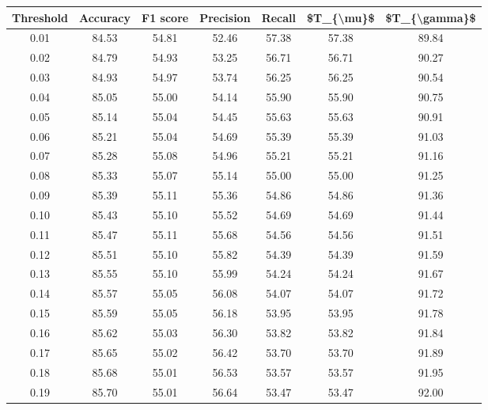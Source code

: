 \begin{tabular}{|c|c|c|c|c|c|c|}
\hline
 Threshold &  Accuracy &  F1 score &  Precision &  Recall &  \$T\_\{\textbackslash mu\}\$ &  \$T\_\{\textbackslash gamma\}\$ \\
\hline
      0.01 &     84.53 &     54.81 &      52.46 &   57.38 &      57.38 &         89.84 \\
      0.02 &     84.79 &     54.93 &      53.25 &   56.71 &      56.71 &         90.27 \\
      0.03 &     84.93 &     54.97 &      53.74 &   56.25 &      56.25 &         90.54 \\
      0.04 &     85.05 &     55.00 &      54.14 &   55.90 &      55.90 &         90.75 \\
      0.05 &     85.14 &     55.04 &      54.45 &   55.63 &      55.63 &         90.91 \\
      0.06 &     85.21 &     55.04 &      54.69 &   55.39 &      55.39 &         91.03 \\
      0.07 &     85.28 &     55.08 &      54.96 &   55.21 &      55.21 &         91.16 \\
      0.08 &     85.33 &     55.07 &      55.14 &   55.00 &      55.00 &         91.25 \\
      0.09 &     85.39 &     55.11 &      55.36 &   54.86 &      54.86 &         91.36 \\
      0.10 &     85.43 &     55.10 &      55.52 &   54.69 &      54.69 &         91.44 \\
      0.11 &     85.47 &     55.11 &      55.68 &   54.56 &      54.56 &         91.51 \\
      0.12 &     85.51 &     55.10 &      55.82 &   54.39 &      54.39 &         91.59 \\
      0.13 &     85.55 &     55.10 &      55.99 &   54.24 &      54.24 &         91.67 \\
      0.14 &     85.57 &     55.05 &      56.08 &   54.07 &      54.07 &         91.72 \\
      0.15 &     85.59 &     55.05 &      56.18 &   53.95 &      53.95 &         91.78 \\
      0.16 &     85.62 &     55.03 &      56.30 &   53.82 &      53.82 &         91.84 \\
      0.17 &     85.65 &     55.02 &      56.42 &   53.70 &      53.70 &         91.89 \\
      0.18 &     85.68 &     55.01 &      56.53 &   53.57 &      53.57 &         91.95 \\
      0.19 &     85.70 &     55.01 &      56.64 &   53.47 &      53.47 &         92.00 \\

\end{tabular}
